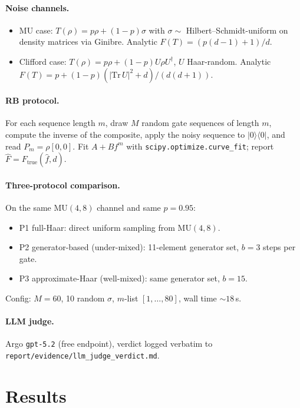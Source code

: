 \documentclass[11pt]{article}
\begin{document}
\paragraph{Noise channels.}
\begin{itemize}
    \item MU case: $T(\rho) = p\rho + (1-p)\sigma$ with $\sigma\sim$ Hilbert--Schmidt-uniform on density matrices via Ginibre. Analytic $F(T) = (p(d-1)+1)/d$.
    \item Clifford case: $T(\rho) = p\rho + (1-p)U\rho U^\dagger$, $U$ Haar-random. Analytic $F(T) = p + (1-p)(|\mathrm{Tr}\,U|^2 + d)/(d(d+1))$.
\end{itemize}

\paragraph{RB protocol.} For each sequence length $m$, draw $M$ random gate sequences of length $m$, compute the inverse of the composite, apply the noisy sequence to $|0\rangle\langle 0|$, and read $P_m = \rho[0,0]$. Fit $A + B f^m$ with \texttt{scipy.optimize.curve\_fit}; report $\hat F = F_{\text{true}}(\hat f, d)$.

\paragraph{Three-protocol comparison.} On the same $\mathrm{MU}(4,8)$ channel and same $p=0.95$:
\begin{itemize}
    \item P1 full-Haar: direct uniform sampling from $\mathrm{MU}(4,8)$.
    \item P2 generator-based (under-mixed): 11-element generator set, $b=3$ steps per gate.
    \item P3 approximate-Haar (well-mixed): same generator set, $b=15$.
\end{itemize}
Config: $M=60$, 10 random $\sigma$, $m$-list $[1,\dots,80]$, wall time $\sim 18$\,s.

\paragraph{LLM judge.} Argo \texttt{gpt-5.2} (free endpoint), verdict logged verbatim to \texttt{report/evidence/llm\_judge\_verdict.md}.

\section{Results}
\end{document}
